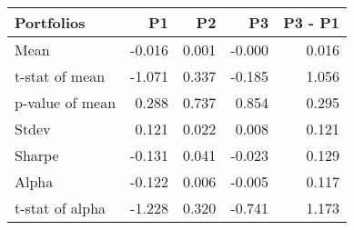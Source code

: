 \begin{tabular}{lrrrr}
\toprule
Portfolios & P1 & P2 & P3 & P3 - P1 \\
\midrule
Mean & -0.016 & 0.001 & -0.000 & 0.016 \\
t-stat of mean & -1.071 & 0.337 & -0.185 & 1.056 \\
p-value of mean & 0.288 & 0.737 & 0.854 & 0.295 \\
Stdev & 0.121 & 0.022 & 0.008 & 0.121 \\
Sharpe & -0.131 & 0.041 & -0.023 & 0.129 \\
Alpha & -0.122 & 0.006 & -0.005 & 0.117 \\
t-stat of alpha & -1.228 & 0.320 & -0.741 & 1.173 \\
\bottomrule
\end{tabular}
